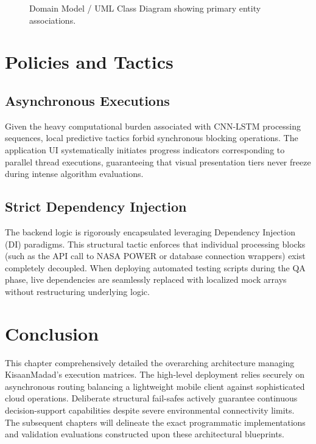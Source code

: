 \begin{figure}[htbp]
  \vspace{0.5cm}
  \caption{Domain Model / UML Class Diagram showing primary entity associations.}
  \label{fig:class_diagram}
\end{figure}


\section{Policies and Tactics}

\subsection{Asynchronous Executions}
Given the heavy computational burden associated with CNN-LSTM processing sequences, local predictive tactics forbid synchronous blocking operations. The application UI systematically initiates progress indicators corresponding to parallel thread executions, guaranteeing that visual presentation tiers never freeze during intense algorithm evaluations.

\subsection{Strict Dependency Injection}
The backend logic is rigorously encapsulated leveraging Dependency Injection (DI) paradigms. This structural tactic enforces that individual processing blocks (such as the API call to NASA POWER or database connection wrappers) exist completely decoupled. When deploying automated testing scripts during the QA phase, live dependencies are seamlessly replaced with localized mock arrays without restructuring underlying logic.

\section{Conclusion}
This chapter comprehensively detailed the overarching architecture managing KisaanMadad's execution matrices. The high-level deployment relies securely on asynchronous routing balancing a lightweight mobile client against sophisticated cloud operations. Deliberate structural fail-safes actively guarantee continuous decision-support capabilities despite severe environmental connectivity limits. The subsequent chapters will delineate the exact programmatic implementations and validation evaluations constructed upon these architectural blueprints.

